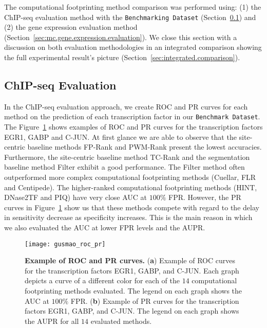 The computational footprinting method comparison was performed using: (1) the ChIP-seq evaluation method with the {\tt Benchmarking Dataset} (Section~\ref{sec:mc.chipseq.evaluation}) and (2) the gene expression evaluation method (Section~\ref{sec:mc.gene.expression.evaluation}). We close this section with a discussion on both evaluation methodologies in an integrated comparison showing the full experimental result's picture (Section~\ref{sec:integrated.comparison}).

\subsection{ChIP-seq Evaluation}
\label{sec:mc.chipseq.evaluation}

In the ChIP-seq evaluation approach, we create ROC and PR curves for each method on the prediction of each transcription factor in our {\tt Benchmark Dataset}. The Figure~\ref{fig:gusmao_roc_pr} shows examples of ROC and PR curves for the transcription factors EGR1, GABP and C-JUN. At first glance we are able to observe that the site-centric baseline methods FP-Rank and PWM-Rank present the lowest accuracies. Furthermore, the site-centric baseline method TC-Rank and the segmentation baseline method Filter exhibit a good performance. The Filter method often outperformed more complex computational footprinting methods (Cuellar, FLR and Centipede). The higher-ranked computational footprinting methods (HINT, DNase2TF and PIQ) have very close AUC at $100\%$ FPR. However, the PR curves in Figure~\ref{fig:gusmao_roc_pr} show us that these methods compete with regard to the delay in sensitivity decrease as specificity increases. This is the main reason in which we also evaluated the AUC at lower FPR levels and the AUPR.

\begin{figure}[h!]
\centering
\texttt{[image: gusmao\_roc\_pr]}
\caption[Example of ROC and PR curves]{\textbf{Example of ROC and PR curves.} (\textbf{a}) Example of ROC curves for the transcription factors EGR1, GABP, and C-JUN. Each graph depicts a curve of a different color for each of the $14$ computational footprinting methods evaluated. The legend on each graph shows the AUC at $100\%$ FPR. (\textbf{b}) Example of PR curves for the transcription factors EGR1, GABP, and C-JUN. The legend on each graph shows the AUPR for all $14$ evaluated methods.}
\label{fig:gusmao_roc_pr}
\end{figure}

